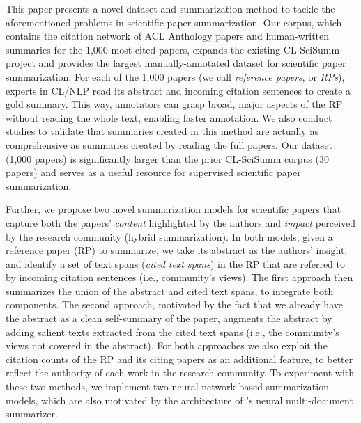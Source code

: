 \documentclass[letterpaper]{article} \usepackage{aaai19}  \usepackage{times}  \usepackage{helvet}  \usepackage{courier}  \usepackage{url}
\begin{document}
This paper presents a novel dataset and summarization method to tackle the aforementioned problems in scientific paper summarization.
Our corpus, which contains the citation network of ACL Anthology papers and human-written summaries for the 1,000 most cited papers, expands the existing CL-SciSumm project \cite{jaidka2016overview} and provides the largest manually-annotated
dataset for scientific paper summarization.
For each of the 1,000 papers (we call {\it reference papers}, or {\it RPs}), experts in CL/NLP read its abstract and incoming citation sentences to create a gold summary.
This way, annotators can grasp broad, major aspects of the RP
without reading the whole text,
enabling faster annotation.
We also conduct studies to validate that summaries created in this method are actually as comprehensive as summaries created by reading the full papers.
Our dataset (1,000 papers) is
significantly larger than the prior CL-SciSumm corpus (30 papers) and serves as a useful resource for supervised scientific paper summarization.

Further, we propose two novel summarization models for scientific papers that
capture
both the papers' \textit{content} highlighted by the authors and \textit{impact}
perceived by
the research community
(hybrid summarization).
In both
models, given a reference paper (RP) to summarize, we take its abstract as the authors' insight, and identify a set of text spans ({\it cited text spans}) in the RP that are referred to by incoming citation sentences (i.e., community's views).
The first approach then
summarizes the union of the abstract and cited text spans, to integrate both components.
The second approach, motivated by the fact that we already have the abstract as a clean self-summary of the paper, augments the abstract by adding salient texts extracted from the cited text spans (i.e., the community's views not covered in the abstract).
For both approaches we also exploit the citation counts of the RP and its citing papers as an additional feature, to better reflect the authority of each work in the research community.
To experiment with these two methods, we implement two neural network-based summarization models, which are also motivated by the architecture of \citet{yasunagaetal2017}'s neural multi-document summarizer.
\end{document}
